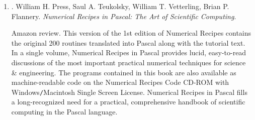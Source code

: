 \documentclass{article}
\begin{document}
\begin{enumerate}
	\item \cite{Press_Teukolsky_Vetterling_Flannery_recipe_Fortran90}. {\sc William H. Press, Saul A. Teukolsky, William T. Vetterling, Brian P. Flannery}. {\it Numerical Recipes in Pascal: The Art of Scientific Computing}. {}

	{\sf Amazon review.} This version of the 1st edition of Numerical Recipes contains the original 200 routines translated into Pascal along with the tutorial text. In a single volume, Numerical Recipes in Pascal provides lucid, easy-to-read discussions of the most important practical numerical techniques for science \& engineering. The programs contained in this book are also available as machine-readable code on the Numerical Recipes Code CD-ROM with Windows{\tt/}Macintosh Single Screen License. Numerical Recipes in Pascal fills a long-recognized need for a practical, comprehensive handbook of scientific computing in the Pascal language.


\end{enumerate}
\end{document}
